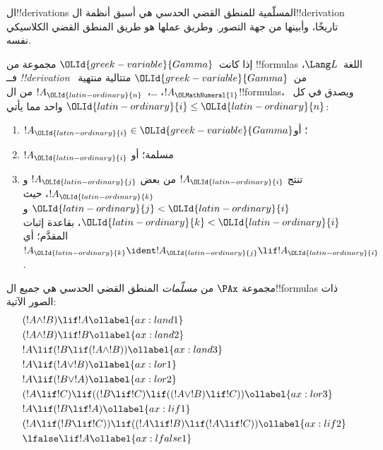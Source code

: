 \documentclass[../../../include/open-logic-section]{subfiles}
\begin{document}


ال!!{derivation}s المسلّمية للمنطق القضي الحدسي هي أسبق أنظمة
ال!!{derivation} تاريخًا، وأبينها من جهة التصور. وطريق عملها هو طريق
المنطق القضي الكلاسيكي نفسه.

\begin{defn}[!!^{derivability}]
إذا كانت~${\OLId{greek-variable}{Gamma}}$ مجموعة من !!{formula}s اللغة~$\Lang L$، فــ
\emph{!!{derivation}} من~${\OLId{greek-variable}{Gamma}}$ متتالية منتهية~$!A_{\OLMathNumeral{1}}$،
\dots،~$!A_{\OLId{latin-ordinary}{n}}$ من ال!!{formula}s، ويصدق في كل~${\OLId{latin-ordinary}{i}} \le {\OLId{latin-ordinary}{n}}$ واحد مما يأتي:
\begin{enumerate}
\item $!A_{\OLId{latin-ordinary}{i}} \in {\OLId{greek-variable}{Gamma}}$؛ أو
\item $!A_{\OLId{latin-ordinary}{i}}$ مسلمة؛ أو
\item تنتج $!A_{\OLId{latin-ordinary}{i}}$ من بعض $!A_{\OLId{latin-ordinary}{j}}$ و$!A_{\OLId{latin-ordinary}{k}}$، حيث ${\OLId{latin-ordinary}{j}} < {\OLId{latin-ordinary}{i}}$ و${\OLId{latin-ordinary}{k}} < {\OLId{latin-ordinary}{i}}$،
  بقاعدة إثبات المقدَّم؛ أي $!A_{\OLId{latin-ordinary}{k}} \ident !A_{\OLId{latin-ordinary}{j}} \lif !A_{\OLId{latin-ordinary}{i}}$.
\end{enumerate}
\end{defn}

\begin{defn}
مجموعة $\PAx$ من \emph{مسلّمات} المنطق القضي الحدسي هي جميع
ال!!{formula}s ذات الصور الآتية:
\begin{align}
  & (!A \land !B) \lif !A \ollabel{ax:land1}\\
  & (!A \land !B) \lif !B \ollabel{ax:land2}\\
  & !A \lif (!B \lif (!A \land !B)) \ollabel{ax:land3}\\
  & !A \lif (!A \lor !B) \ollabel{ax:lor1}\\
  & !A \lif (!B \lor !A) \ollabel{ax:lor2}\\
  & (!A \lif !C) \lif ((!B \lif !C) \lif ((!A \lor !B) \lif !C)) \ollabel{ax:lor3}\\
  & !A \lif (!B \lif !A) \ollabel{ax:lif1}\\
  & (!A \lif (!B \lif !C)) \lif ((!A \lif !B) \lif (!A \lif !C)) \ollabel{ax:lif2}\\
  & \lfalse \lif !A \ollabel{ax:lfalse1}
\end{align}
\end{defn}
\end{document}

